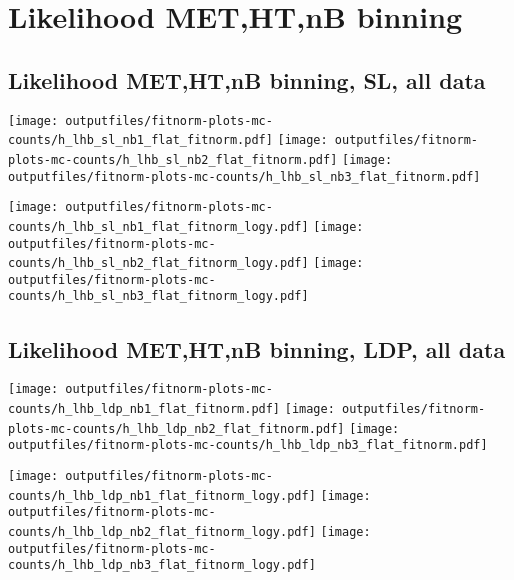 \documentclass[11pt]{article}
\begin{document}
   \clearpage







   \section{Likelihood MET,HT,nB binning}
    \subsection{ Likelihood MET,HT,nB binning, SL, all data}

    \noindent
     \texttt{[image: outputfiles/fitnorm-plots-mc-counts/h\_lhb\_sl\_nb1\_flat\_fitnorm.pdf]}
     \texttt{[image: outputfiles/fitnorm-plots-mc-counts/h\_lhb\_sl\_nb2\_flat\_fitnorm.pdf]}
     \texttt{[image: outputfiles/fitnorm-plots-mc-counts/h\_lhb\_sl\_nb3\_flat\_fitnorm.pdf]}

    \noindent
     \texttt{[image: outputfiles/fitnorm-plots-mc-counts/h\_lhb\_sl\_nb1\_flat\_fitnorm\_logy.pdf]}
     \texttt{[image: outputfiles/fitnorm-plots-mc-counts/h\_lhb\_sl\_nb2\_flat\_fitnorm\_logy.pdf]}
     \texttt{[image: outputfiles/fitnorm-plots-mc-counts/h\_lhb\_sl\_nb3\_flat\_fitnorm\_logy.pdf]}

    \clearpage






    \subsection{ Likelihood MET,HT,nB binning, LDP, all data}

    \noindent
     \texttt{[image: outputfiles/fitnorm-plots-mc-counts/h\_lhb\_ldp\_nb1\_flat\_fitnorm.pdf]}
     \texttt{[image: outputfiles/fitnorm-plots-mc-counts/h\_lhb\_ldp\_nb2\_flat\_fitnorm.pdf]}
     \texttt{[image: outputfiles/fitnorm-plots-mc-counts/h\_lhb\_ldp\_nb3\_flat\_fitnorm.pdf]}

    \noindent
     \texttt{[image: outputfiles/fitnorm-plots-mc-counts/h\_lhb\_ldp\_nb1\_flat\_fitnorm\_logy.pdf]}
     \texttt{[image: outputfiles/fitnorm-plots-mc-counts/h\_lhb\_ldp\_nb2\_flat\_fitnorm\_logy.pdf]}
     \texttt{[image: outputfiles/fitnorm-plots-mc-counts/h\_lhb\_ldp\_nb3\_flat\_fitnorm\_logy.pdf]}
\end{document}
